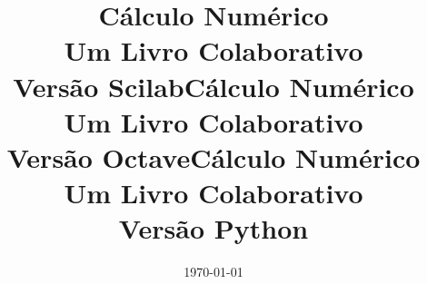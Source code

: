 \documentclass[12pt]{book}
\begin{document}
\frontmatter

\ifisscilab
\title{Cálculo Numérico\\\small{Um Livro Colaborativo}\\\small{Versão Scilab}}
\fi
\ifisoctave
\title{Cálculo Numérico\\\small{Um Livro Colaborativo}\\\small{Versão Octave}}
\fi
\ifispython
\title{Cálculo Numérico\\\small{Um Livro Colaborativo}\\\small{Versão Python}}
\fi
\author{}
\date{\today}
\ifishtml
\else
{}
\fi

\ifishtml
\else
\AddToShipoutPicture*{\BackgroundPic}
\fi
\maketitle






\ifisslide
\tableofcontents
\else
\ifishtml
\else
\tableofcontents
{}
\fi
\fi

\mainmatter


%
%
%
%

%

%
%

%

%


%

%
%

%
%

\ifisscilab
\appendix

%

\fi
\ifispython
\appendix

%

\fi

\ifishtml
\else



\shipoutAnswer  
\fi

\nocite{*}




\ifishtml
\else
\clearpage
{}
\printindex
\fi
\end{document}
